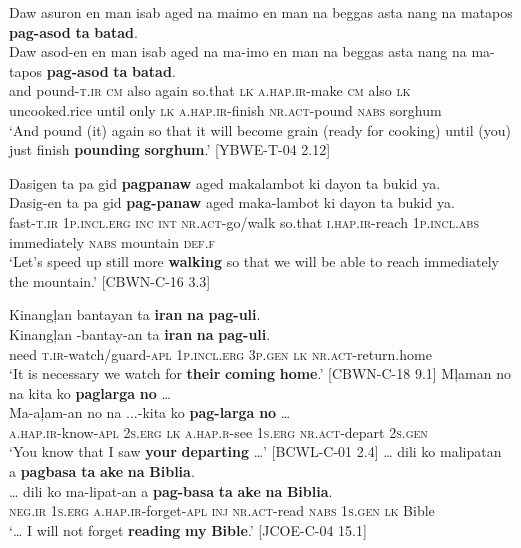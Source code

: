 \ea
\label{bkm:Ref114814303}
 Daw  asuron  en  man  isab  aged  na  maimo  en  man  na beggas  asta  nang  na  matapos  \textbf{pag-asod}  \textbf{ta}  \textbf{batad}. \smallskip\\
 \gll Daw  asod-en  en  man  isab  aged  na  ma-imo  en  man  na beggas  asta  nang  na  ma-tapos  \textbf{pag-asod}  \textbf{ta}  \textbf{batad}. \\
and  pound-\textsc{t.ir}  \textsc{cm}  also  again  so.that  \textsc{lk}  \textsc{a.hap.ir}-make  \textsc{cm}  also  \textsc{lk}\\
uncooked.rice  until  only  \textsc{lk}  \textsc{a.hap.ir}-finish  \textsc{nr.act}-pound  \textsc{nabs}  sorghum \\
\glt ‘And pound (it) again so that it will become grain (ready for cooking) until (you) just finish \textbf{pounding} \textbf{sorghum}.’ [YBWE-T-04 2.12]
\z

\ea
Dasigen  ta  pa  gid  \textbf{pagpanaw}  aged  makalambot ki  dayon  ta  bukid  ya. \smallskip\\
\gll Dasig-en  ta  pa  gid  \textbf{pag-panaw}  aged  maka-lambot ki  dayon  ta  bukid  ya. \\
fast-\textsc{t.ir}  1\textsc{p.incl.erg}  \textsc{inc}  \textsc{int}  \textsc{nr.act}-go/walk  so.that  \textsc{i.hap.ir}-reach 1\textsc{p.incl.abs}  immediately  \textsc{nabs}  mountain  \textsc{def.f} \\
\glt `Let’s speed up still more \textbf{walking} so that we will be able to reach immediately the mountain.’ [CBWN-C-16 3.3]
\z

\ea
Kinangļan  bantayan  ta  \textbf{iran}  \textbf{na}  \textbf{pag-uli}. \smallskip\\
\gll Kinangļan  \emptyset{}-bantay-an  ta  \textbf{iran}  \textbf{na}  \textbf{pag-uli}. \\
need  \textsc{t.ir}-watch/guard-\textsc{apl}  1\textsc{p.incl.erg}  3\textsc{p.gen}  \textsc{lk}  \textsc{nr.act}-return.home \\
\glt ‘It is necessary we watch for \textbf{their} \textbf{coming} \textbf{home}.’ [CBWN-C-18 9.1]
\z
\ea
Mļaman  no  na  kita  ko  \textbf{paglarga}  \textbf{no} … \smallskip\\
\gll Ma-aļam-an  no  na  ...-kita  ko  \textbf{pag-larga}  \textbf{no} … \\
\textsc{a.hap.ir}-know-\textsc{apl}  2\textsc{s.erg}  \textsc{lk}  \textsc{a.hap.r}-see  1\textsc{s.erg}  \textsc{nr.act}-depart  2\textsc{s.gen} \\
\glt ‘You know that I saw \textbf{your} \textbf{departing} …’ [BCWL-C-01 2.4]
\z
\ea
… dili  ko  malipatan  a  \textbf{pagbasa}  \textbf{ta}  \textbf{ake}  \textbf{na}  \textbf{Biblia}. \smallskip\\
\gll … dili  ko  ma-lipat-an  a  \textbf{pag-basa}  \textbf{ta}  \textbf{ake}  \textbf{na}  \textbf{Biblia}. \\
{}  \textsc{neg.ir}  1\textsc{s.erg}  \textsc{a.hap.ir}-forget-\textsc{apl}  \textsc{inj}  \textsc{nr.act}-read  \textsc{nabs}  1\textsc{s.gen}  \textsc{lk}  Bible \\
\glt ‘… I will not forget \textbf{reading} \textbf{my} \textbf{Bible}.’ [JCOE-C-04 15.1]
\z

